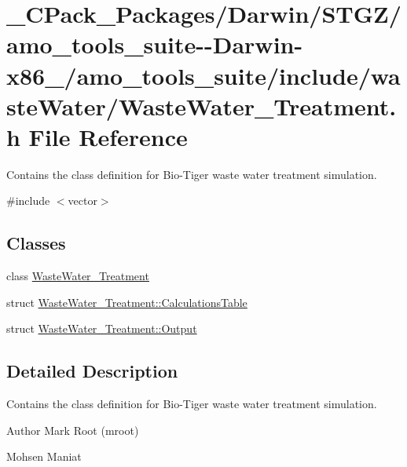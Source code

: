 \hypertarget{___c_pack___packages_2_darwin_2_s_t_g_z_2amo__tools__suite--_darwin-x86__64_2amo__tools__suite_2e397a2091b0b2529235d99ce4a62cd4a}{}\section{\+\_\+\+C\+Pack\+\_\+\+Packages/\+Darwin/\+S\+T\+G\+Z/amo\+\_\+tools\+\_\+suite-\/-\/\+Darwin-\/x86\+\_/amo\+\_\+tools\+\_\+suite/include/waste\+Water/\+Waste\+Water\+\_\+\+Treatment.h File Reference}
\label{___c_pack___packages_2_darwin_2_s_t_g_z_2amo__tools__suite--_darwin-x86__64_2amo__tools__suite_2e397a2091b0b2529235d99ce4a62cd4a}


Contains the class definition for Bio-\/\+Tiger waste water treatment simulation.  


{\ttfamily \#include $<$vector$>$}\newline
\subsection*{Classes}
\begin{DoxyCompactItemize}
\item 
class \hyperlink{class_waste_water___treatment}{Waste\+Water\+\_\+\+Treatment}
\item 
struct \hyperlink{struct_waste_water___treatment_1_1_calculations_table}{Waste\+Water\+\_\+\+Treatment\+::\+Calculations\+Table}
\item 
struct \hyperlink{struct_waste_water___treatment_1_1_output}{Waste\+Water\+\_\+\+Treatment\+::\+Output}
\end{DoxyCompactItemize}


\subsection{Detailed Description}
Contains the class definition for Bio-\/\+Tiger waste water treatment simulation. 

\begin{DoxyAuthor}{Author}
Mark Root (mroot) 

Mohsen Maniat 
\end{DoxyAuthor}
